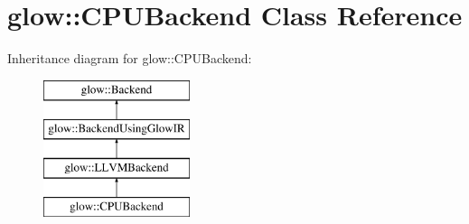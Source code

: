 \hypertarget{classglow_1_1_c_p_u_backend}{}\section{glow\+:\+:C\+P\+U\+Backend Class Reference}
\label{classglow_1_1_c_p_u_backend}
Inheritance diagram for glow\+:\+:C\+P\+U\+Backend\+:\begin{figure}[H]
\begin{center}
\leavevmode
\includegraphics[height=4.000000cm]{classglow_1_1_c_p_u_backend}
\end{center}
\end{figure}
